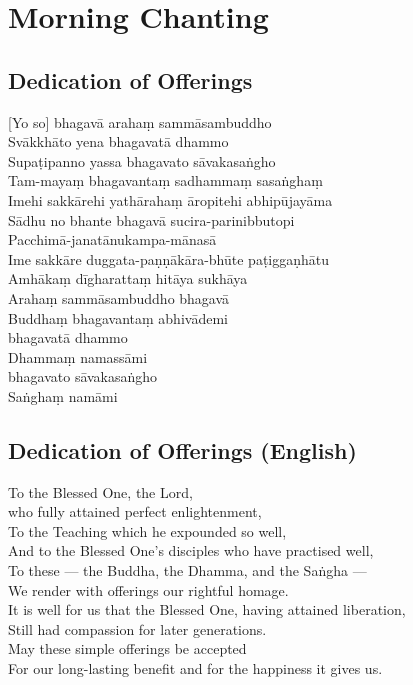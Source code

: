 \chapter{Morning Chanting}

\section*{Dedication of Offerings}

[Yo so] bhagavā arahaṃ sammāsambuddho\\
Svākkhāto yena bhagavatā dhammo\\
Supaṭipanno yassa bhagavato sāvakasaṅgho\\
Tam-mayaṃ bhagavantaṃ sadhammaṃ sasaṅghaṃ\\
Imehi sakkārehi yathārahaṃ āropitehi abhipūjayāma\\
Sādhu no bhante bhagavā sucira-parinibbutopi\\
Pacchimā-janatānukampa-mānasā\\
Ime sakkāre duggata-paṇṇākāra-bhūte paṭiggaṇhātu\\
Amhākaṃ dīgharattaṃ hitāya sukhāya\\
Arahaṃ sammāsambuddho bhagavā\\
Buddhaṃ bhagavantaṃ abhivādemi\\\relax
[Svākkhāto] bhagavatā dhammo\\
Dhammaṃ namassāmi\\\relax
[Supaṭipanno] bhagavato sāvakasaṅgho\\
Saṅghaṃ namāmi

\section*{Dedication of Offerings (English)}

To the Blessed One, the Lord,\\\vin who fully attained perfect enlightenment,\\
To the Teaching which he expounded so well,\\
And to the Blessed One's disciples who have practised well,\\
To these --- the Buddha, the Dhamma, and the Saṅgha ---\\
We render with offerings our rightful homage.\\
It is well for us that the Blessed One, having attained liberation,\\
Still had compassion for later generations.\\
May these simple offerings be accepted\\
For our long-lasting benefit and for the happiness it gives us.

